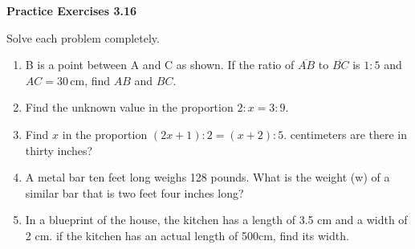 \vspace{0.3ex}
\noindent\textbf{Practice Exercises 3.16}

\vspace{0.2ex}

Solve each problem completely.

\begin{enumerate}[noitemsep, label = \color{blue}\arabic*. ]
\item B is a point between A and C as shown. If the ratio of \(\overline{AB}\) to \(\overline{BC}\) is \(1:5\) and \(AC = 30 \, \text{cm}\), find \(AB\) and \(BC\).
\item Find the unknown value in the proportion \(2 : x = 3 : 9\).
\item Find \(x\) in the proportion \((2x + 1) : 2 = (x + 2) : 5\).
centimeters are there in thirty inches?
\item  A metal bar ten feet long weighs 128 pounds. What is the weight (w) of
a similar bar that is two feet four inches long?
\item In a blueprint of the house, the kitchen has a length of 3.5 cm and a
width of 2 cm. if the kitchen has an actual length of 500cm, find its width.
\end{enumerate}
